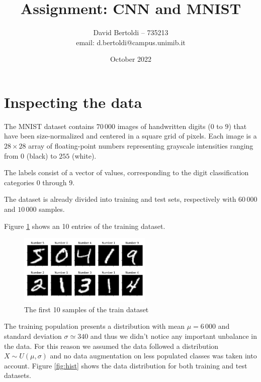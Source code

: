 \documentclass[compsoc]{IEEEtran}
\title{Assignment: CNN and MNIST}
\author{David Bertoldi -- 735213 \\ email: d.bertoldi@campus.unimib.it}
\affil{Department of Informatics, Systems and Communication}
\affil{University of Milano-Bicocca}
\date{October 2022}
\begin{document}
\maketitle 



\section{Inspecting the data}\label{sec:insp}
The MNIST dataset contains $70\,000$ images of handwritten digits ($0$ to $9$) that have been size-normalized and centered in a square grid of pixels. Each image is a $28 \times 28$ array of floating-point numbers representing grayscale intensities ranging from $0$ (black) to $255$ (white). \par
The labels consist of a vector of values, corresponding to the digit classification categories $0$ through $9$. \par
The dataset is already divided into training and test sets, respectively with $60\,000$ and $10\,000$ samples. \par

Figure \ref{fig:data} shows an 10 entries of the training dataset.

\begin{figure}[ht!]
\centering                                                                        
\includegraphics[width=2.5in]{data.png}
\captionsetup{justification=centering}                                                                                         
\caption{The first 10 samples of the train dataset}
\label{fig:data}                                                                                                                               
\end{figure}




The training population presents a distribution with mean $\mu = 6\,000$ and standard deviation $\sigma \simeq 340$ and thus we didn't notice any important unbalance in the data. For this reason we assumed the data followed a distribution $X \sim U(\mu, \sigma)$ and no data augmentation on less populated classes was taken into account. Figure \ref{fig:hist} shows the data distribution for both training and test datasets.
\end{document}
